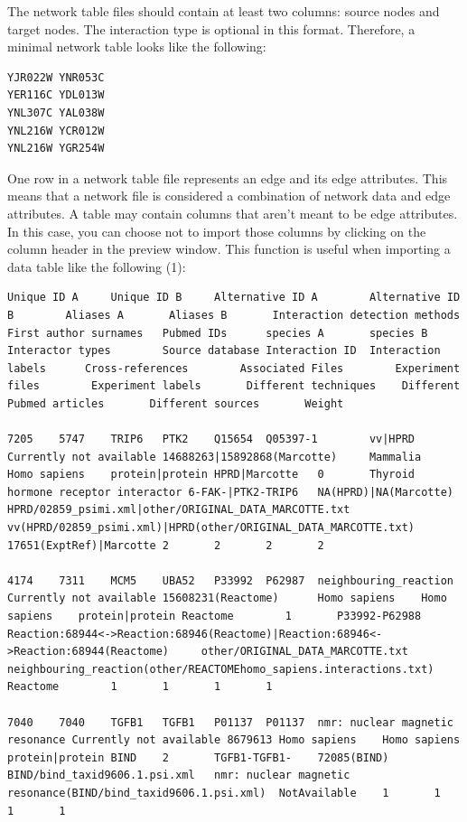  The network table files should contain at least two columns: source nodes and target nodes. The interaction type is optional in this format. Therefore, a minimal network table looks like the following: 

 \begin{verbatim}
YJR022W YNR053C
YER116C YDL013W
YNL307C YAL038W
YNL216W YCR012W
YNL216W YGR254W
\end{verbatim}

 One row in a network table file represents an edge and its edge attributes. This means that a network file is considered a combination of network data and edge attributes. A table may contain columns that aren't meant to be edge attributes. In this case, you can choose not to import those columns by clicking on the column header in the preview window. This function is useful when importing a data table like the following (1): 
\begin{verbatim}
Unique ID A     Unique ID B     Alternative ID A        Alternative ID B        Aliases A       Aliases B       Interaction detection methods   First author surnames   Pubmed IDs      species A       species B       Interactor types        Source database Interaction ID  Interaction labels      Cross-references        Associated Files        Experiment files        Experiment labels       Different techniques    Different Pubmed articles       Different sources       Weight

7205    5747    TRIP6   PTK2    Q15654  Q05397-1        vv|HPRD Currently not available 14688263|15892868(Marcotte)     Mammalia        Homo sapiens    protein|protein HPRD|Marcotte   0       Thyroid hormone receptor interactor 6-FAK-|PTK2-TRIP6   NA(HPRD)|NA(Marcotte)   HPRD/02859_psimi.xml|other/ORIGINAL_DATA_MARCOTTE.txt   vv(HPRD/02859_psimi.xml)|HPRD(other/ORIGINAL_DATA_MARCOTTE.txt) 17651(ExptRef)|Marcotte 2       2       2       2

4174    7311    MCM5    UBA52   P33992  P62987  neighbouring_reaction   Currently not available 15608231(Reactome)      Homo sapiens    Homo sapiens    protein|protein Reactome        1       P33992-P62988   Reaction:68944<->Reaction:68946(Reactome)|Reaction:68946<->Reaction:68944(Reactome)     other/ORIGINAL_DATA_MARCOTTE.txt        neighbouring_reaction(other/REACTOMEhomo_sapiens.interactions.txt)      Reactome        1       1       1       1

7040    7040    TGFB1   TGFB1   P01137  P01137  nmr: nuclear magnetic resonance Currently not available 8679613 Homo sapiens    Homo sapiens    protein|protein BIND    2       TGFB1-TGFB1-    72085(BIND)     BIND/bind_taxid9606.1.psi.xml   nmr: nuclear magnetic resonance(BIND/bind_taxid9606.1.psi.xml)  NotAvailable    1       1       1       1

\end{verbatim}

